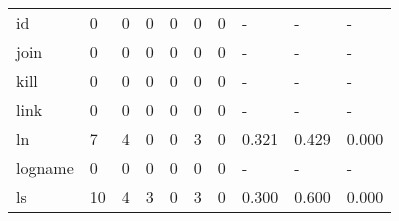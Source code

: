 \begin{longtable}{lp{2.0cm}p{2.0cm}p{2.0cm}p{2.0cm}p{2.0cm}p{2.0cm}p{2.0cm}p{2.0cm}p{2.0cm}}
id        &                      0 &                                  0 &                                 0 &                                0 &                                 0 &                               0 &                                    - &                                      - &                                    - \\
join      &                      0 &                                  0 &                                 0 &                                0 &                                 0 &                               0 &                                    - &                                      - &                                    - \\
kill      &                      0 &                                  0 &                                 0 &                                0 &                                 0 &                               0 &                                    - &                                      - &                                    - \\
link      &                      0 &                                  0 &                                 0 &                                0 &                                 0 &                               0 &                                    - &                                      - &                                    - \\
ln        &                      7 &                                  4 &                                 0 &                                0 &                                 3 &                               0 &                                0.321 &                                  0.429 &                                0.000 \\
logname   &                      0 &                                  0 &                                 0 &                                0 &                                 0 &                               0 &                                    - &                                      - &                                    - \\
ls        &                     10 &                                  4 &                                 3 &                                0 &                                 3 &                               0 &                                0.300 &                                  0.600 &                                0.000 \\

\end{longtable}
